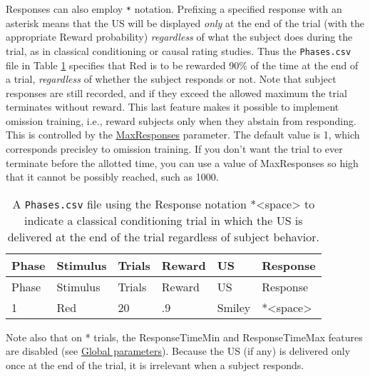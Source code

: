 \documentclass[11pt,]{article}
\begin{document}
Responses can also employ \texttt{*} notation. Prefixing a specified
response with an asterisk means that the US will be displayed
\emph{only} at the end of the trial (with the appropriate Reward
probability) \emph{regardless} of what the subject does during the
trial, as in classical conditioning or causal rating studies. Thus the
\texttt{Phases.csv} file in Table \ref{classical} specifies that Red is
to be rewarded 90\% of the time at the end of a trial, \emph{regardless}
of whether the subject responds or not. Note that subject responses are
still recorded, and if they exceed the allowed maximum the trial
terminates without reward. This last feature makes it possible to
implement omission training, i.e., reward subjects only when they
abstain from responding. This is controlled by the
\hyperref[maxresponses]{MaxResponses} parameter. The default value is 1,
which corresponds precisley to omission training. If you don't want the
trial to ever terminate before the allotted time, you can use a value of
MaxResponses so high that it cannot be possibly reached, such as 1000.

\begin{longtable}[c]{@{}llllll@{}}
\caption{A \texttt{Phases.csv} file using the Response notation
*\textless{}space\textgreater{} to indicate a classical conditioning
trial in which the US is delivered at the end of the trial regardless of
subject behavior. \label{classical}}\tabularnewline
\toprule
Phase & Stimulus & Trials & Reward & US & Response\tabularnewline
\midrule
\endfirsthead
\toprule
Phase & Stimulus & Trials & Reward & US & Response\tabularnewline
\midrule
\endhead
1 & Red & 20 & .9 & Smiley &
*\textless{}space\textgreater{}\tabularnewline
\bottomrule
\end{longtable}

Note also that on * trials, the ResponseTimeMin and ResponseTimeMax
features are disabled (see \hyperref[global]{Global parameters}).
Because the US (if any) is delivered only once at the end of the trial,
it is irrelevant when a subject responds.

\end{document}
